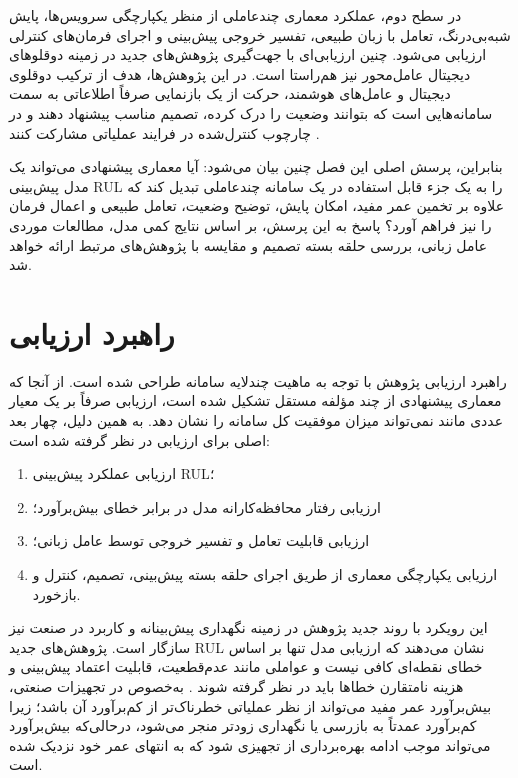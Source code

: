در سطح دوم، عملکرد معماری چندعاملی از منظر یکپارچگی سرویس‌ها، پایش شبه‌بی‌درنگ، تعامل با زبان طبیعی، تفسیر خروجی پیش‌بینی و اجرای فرمان‌های کنترلی ارزیابی می‌شود. چنین ارزیابی‌ای با جهت‌گیری پژوهش‌های جدید در زمینه دوقلوهای دیجیتال عامل‌محور نیز هم‌راستا است. در این پژوهش‌ها، هدف از ترکیب دوقلوی دیجیتال و عامل‌های هوشمند، حرکت از یک بازنمایی صرفاً اطلاعاتی به سمت سامانه‌هایی است که بتوانند وضعیت را درک کرده، تصمیم مناسب پیشنهاد دهند و در چارچوب کنترل‌شده در فرایند عملیاتی مشارکت کنند \cite{lopez2024madtwin,puiu2025synergies,nicoletti2026humanagentic}.

بنابراین، پرسش اصلی این فصل چنین بیان می‌شود: آیا معماری پیشنهادی می‌تواند یک مدل پیش‌بینی \gls{RUL} را به یک جزء قابل استفاده در یک سامانه چندعاملی تبدیل کند که علاوه بر تخمین عمر مفید، امکان پایش، توضیح وضعیت، تعامل طبیعی و اعمال فرمان را نیز فراهم آورد؟ پاسخ به این پرسش، بر اساس نتایج کمی مدل، مطالعات موردی عامل زبانی، بررسی حلقه بسته تصمیم و مقایسه با پژوهش‌های مرتبط ارائه خواهد شد.

\section{راهبرد ارزیابی}
\label{sec:evaluation-strategy}

راهبرد ارزیابی پژوهش با توجه به ماهیت چندلایه سامانه طراحی شده است. از آنجا که معماری پیشنهادی از چند مؤلفه مستقل تشکیل شده است، ارزیابی صرفاً بر یک معیار عددی مانند  نمی‌تواند میزان موفقیت کل سامانه را نشان دهد. به همین دلیل، چهار بعد اصلی برای ارزیابی در نظر گرفته شده است:

\begin{enumerate}
	\item ارزیابی عملکرد پیش‌بینی \gls{RUL}؛
	\item ارزیابی رفتار محافظه‌کارانه مدل در برابر خطای بیش‌برآورد؛
	\item ارزیابی قابلیت تعامل و تفسیر خروجی توسط عامل زبانی؛
	\item ارزیابی یکپارچگی معماری از طریق اجرای حلقه بسته پیش‌بینی، تصمیم، کنترل و بازخورد.
\end{enumerate}

این رویکرد با روند جدید پژوهش در زمینه نگهداری پیش‌بینانه و کاربرد در صنعت نیز سازگار است. پژوهش‌های جدید \gls{RUL} نشان می‌دهند که ارزیابی مدل تنها بر اساس خطای نقطه‌ای کافی نیست و عواملی مانند عدم‌قطعیت، قابلیت اعتماد پیش‌بینی و هزینه نامتقارن خطاها باید در نظر گرفته شوند \cite{diao2026reliable,hatipoglu2025matrix}. به‌خصوص در تجهیزات صنعتی، بیش‌برآورد عمر مفید می‌تواند از نظر عملیاتی خطرناک‌تر از کم‌برآورد آن باشد؛ زیرا کم‌برآورد عمدتاً به بازرسی یا نگهداری زودتر منجر می‌شود، درحالی‌که بیش‌برآورد می‌تواند موجب ادامه بهره‌برداری از تجهیزی شود که به انتهای عمر خود نزدیک شده است.

